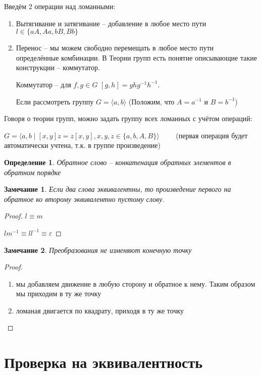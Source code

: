 \documentclass[12pt,a4paper, flushleft]{article}
\newtheorem{Def}{Определение}[section]
\newtheorem{Zm}{Замечание}[section]
\begin{document}
Введём 2 операции над ломанными:
\begin{enumerate}
	\item Вытягивание и затягивание -- добавление в любое место пути $l\in\{aA, Aa, bB, Bb\}$
	\item Перенос -- мы можем свободно перемещать в любое место пути определённые комбинации. В Теории групп есть понятие описывающие такие конструкции -- коммутатор.
	
	Коммутатор -- для $f, g\in G$  $ [g, h] = ghg^{-1}h^{-1}$. 
	
	Если рассмотреть группу $G = \langle a, b\rangle$ (Положим, что $A = a^{-1}$ и $B = b^{-1}$)
\end{enumerate}

Говоря о теории групп, можно задать группу всех ломанных с учётом операций:

$G =\langle a, b\mid [x, y]z = z[x, y], x, y, z\in \{a, b, A, B\}\rangle\quad\quad $ (первая операция будет автоматически учтена, т.к. в группе произведение)

\begin{Def}
	Обратное слово -- конкатенация обратных элементов в обратном порядке
\end{Def}

\begin{Zm}
	Если два слова эквивалентны, то произведение первого на обратное ко второму эквивалентно пустому слову. 
\end{Zm}
\begin{proof}
	$l\equiv m$
	
	$lm^{-1} \equiv ll^{-1}\equiv \varepsilon$
\end{proof}

\begin{Zm}
	Преобразования не изменяют  конечную точку
\end{Zm}
\begin{proof}
\begin{enumerate}
	\item мы добавляем движение в любую сторону и обратное к нему. Таким образом мы приходим в ту же точку
	\item ломаная двигается по квадрату, приходя в ту же точку
\end{enumerate}
\end{proof}
\section{Проверка на эквивалентность}
\end{document}
